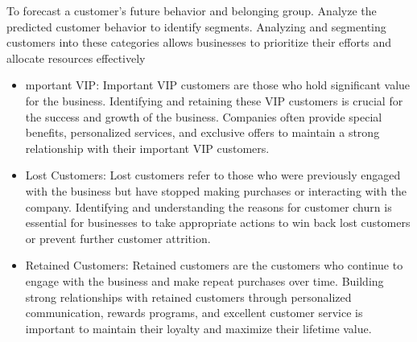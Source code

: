 \documentclass[
  11pt,
]{article}
\begin{document}
To forecast a customer's future behavior and belonging group. Analyze
the predicted customer behavior to identify segments. Analyzing and
segmenting customers into these categories allows businesses to
prioritize their efforts and allocate resources effectively

\begin{itemize}
\item
  mportant VIP: Important VIP customers are those who hold significant
  value for the business. Identifying and retaining these VIP customers
  is crucial for the success and growth of the business. Companies often
  provide special benefits, personalized services, and exclusive offers
  to maintain a strong relationship with their important VIP customers.
\item
  Lost Customers: Lost customers refer to those who were previously
  engaged with the business but have stopped making purchases or
  interacting with the company. Identifying and understanding the
  reasons for customer churn is essential for businesses to take
  appropriate actions to win back lost customers or prevent further
  customer attrition.
\item
  Retained Customers: Retained customers are the customers who continue
  to engage with the business and make repeat purchases over time.
  Building strong relationships with retained customers through
  personalized communication, rewards programs, and excellent customer
  service is important to maintain their loyalty and maximize their
  lifetime value.
\end{itemize}
\end{document}
